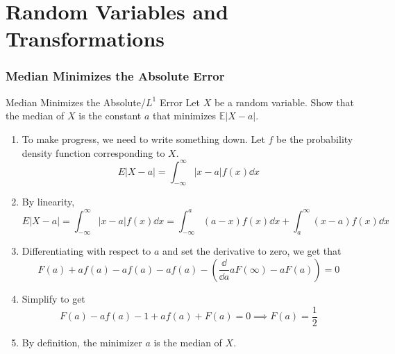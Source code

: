 \documentclass[../main]{subfiles}
\begin{document}
\chapter{Random Variables and Transformations}
\subsection{Median Minimizes the Absolute Error}
\begin{bbox}{Median Minimizes the Absolute/$L^1$ Error}
    Let $X$ be a random variable. Show that the median of $X$ is the constant $a$ that minimizes $\mathbb E |X-a|$.
\end{bbox}
\begin{solution}
    \begin{enumerate}
        \item To make progress, we need to write something down. Let $f$ be the probability density function corresponding to $X$.
        \[
        E |X-a| = \int_{-\infty}^\infty |x-a| f(x)\dd x
        \]
        \item By linearity,
        \[
        E |X-a| = \int_{-\infty}^\infty |x-a| f(x)\dd x = \int_{-\infty}^a (a-x) f(x)  \dd x + \int_{a}^\infty (x-a) f(x) \dd x
        \]
        \item Differentiating with respect to $a$ and set the derivative to zero, we get that
        \[
        F(a) + af(a) - af(a) - af(a) - (\frac{\dd}{\dd a} aF(\infty) - aF(a)) = 0
        \]
        \item Simplify to get 
        \[
        F(a) - a f(a) - 1 + af(a) + F(a) = 0 \implies F(a) = \frac{1}{2}
        \]
        \item By definition, the minimizer $a$ is the median of $X$.
    \end{enumerate}
\end{solution}
\end{document}
